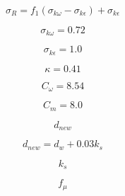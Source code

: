 {\newpage\clearpage
{}%
\begin{displaymath}
\sigma _{R}= f_{1}(\sigma _{k\omega }- \sigma _{k\epsilon })+\sigma_{k\epsilon }
\end{displaymath}%
\lthtmldisplayZ
\lthtmlcheckvsize\clearpage}

{\newpage\clearpage
{}%
\begin{displaymath}
\sigma _{k\omega }=0.72
\end{displaymath}%
\lthtmldisplayZ
\lthtmlcheckvsize\clearpage}

{\newpage\clearpage
{}%
\begin{displaymath}
\sigma _{k\epsilon }=1.0
\end{displaymath}%
\lthtmldisplayZ
\lthtmlcheckvsize\clearpage}

{\newpage\clearpage
{}%
\begin{displaymath}
\kappa =0.41
\end{displaymath}%
\lthtmldisplayZ
\lthtmlcheckvsize\clearpage}

{\newpage\clearpage
{}%
\begin{displaymath}
C_{\omega }=8.54
\end{displaymath}%
\lthtmldisplayZ
\lthtmlcheckvsize\clearpage}

{\newpage\clearpage
{}%
\begin{displaymath}
C_{m}=8.0
\end{displaymath}%
\lthtmldisplayZ
\lthtmlcheckvsize\clearpage}

{\newpage\clearpage
{}%
\begin{displaymath}
d_{new}
\end{displaymath}%
\lthtmldisplayZ
\lthtmlcheckvsize\clearpage}

{\newpage\clearpage
{}%
\begin{displaymath}
d_{new}=d_{w}+0.03k_{s}
\end{displaymath}%
\lthtmldisplayZ
\lthtmlcheckvsize\clearpage}

{\newpage\clearpage
{}%
\begin{displaymath}
k_s
\end{displaymath}%
\lthtmldisplayZ
\lthtmlcheckvsize\clearpage}

{\newpage\clearpage
{}%
\begin{displaymath}
f_{\mu}
\end{displaymath}%
\lthtmldisplayZ
\lthtmlcheckvsize\clearpage}

